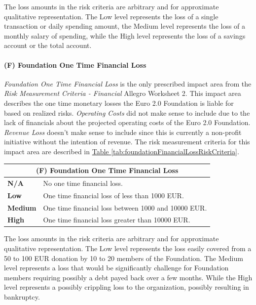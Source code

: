 \documentclass[a4paper,12pt]{article} %
\newcommand{\hypertableref}[1]{\hyperref[#1]{Table \ref{#1}}}
\begin{document}
{The loss amounts in the risk criteria are arbitrary and for approximate qualitative representation. The Low level represents the loss of a single transaction or daily spending amount, the Medium level represents the loss of a monthly salary of spending, while the High level represents the loss of a savings account or the total account.

\paragraph{(F) Foundation One Time Financial Loss}

\textit{Foundation One Time Financial Loss} is the only prescribed impact area from the \textit{Risk Measurement Criteria - Financial} Allegro Worksheet 2. This impact area describes the one time monetary losses the Euro 2.0 Foundation is liable for based on realized risks. \textit{Operating Costs} did not make sense to include due to the lack of financials about the projected operating costs of the Euro 2.0 Foundation. \textit{Revenue Loss} doesn't make sense to include since this is currently a non-profit initiative without the intention of revenue. The risk measurement criteria for this impact area are described in \hypertableref{tab:foundationFinancialLossRiskCriteria}.

\begin{center}
\begin{tabular}{ | l | p{12cm} | }
  \hline
  \multicolumn{2}{|c|}{\textbf{(F) Foundation One Time Financial Loss}}
  \\ \hline
  \textbf{N/A} & No one time financial loss.
  \\ \hline
  \textbf{Low} & One time financial loss of less than 1000 EUR.
  \\ \hline
  \textbf{Medium} & One time financial loss between 1000 and 10000 EUR.
  \\ \hline
  \textbf{High} & One time financial loss greater than 10000 EUR.
  \\ \hline
\end{tabular}
\end{center}
\label{tab:foundationFinancialLossRiskCriteria}

The loss amounts in the risk criteria are arbitrary and for approximate qualitative representation. The Low level represents the loss easily covered from a 50 to 100 EUR donation by 10 to 20 members of the Foundation. The Medium level represents a loss that would be significantly challenge for Foundation members requiring possibly a debt payed back over a few months. While the High level represents a possibly crippling loss to the organization, possibly resulting in bankruptcy.

}
\end{document}
